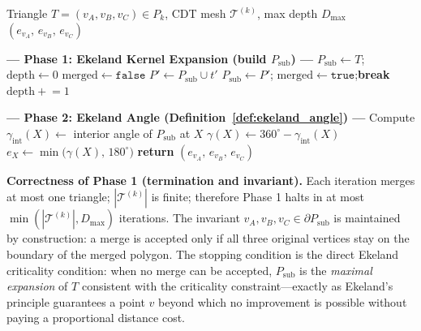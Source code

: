 \documentclass[10pt]{article}
\theoremstyle{plain}
\theoremstyle{definition}
\begin{document}
\begin{algorithm}[htbp]
\caption{Axis-Parallel Reflection Ekeland Angle at triangle vertices}
\label{alg:mfca}
\begin{algorithmic}[1]
\Require Triangle $T=(v_A,v_B,v_C) \in P_k$, CDT mesh $\mathcal{T}^{(k)}$,
         max depth $D_{\max}$
\Ensure $(e_{v_A},\,e_{v_B},\,e_{v_C})$

\smallskip
\State \textbf{--- Phase 1: Ekeland Kernel Expansion (build $P_{\mathrm{sub}}$) ---}
\State $P_{\mathrm{sub}} \leftarrow T$;\quad $\mathrm{depth} \leftarrow 0$
\Repeat
  \State $\mathrm{merged} \leftarrow \mathtt{false}$
    \State $P' \leftarrow P_{\mathrm{sub}} \cup t'$ \quad{}
      \State $P_{\mathrm{sub}} \leftarrow P'$;\quad
             $\mathrm{merged} \leftarrow \mathtt{true}$;\quad \textbf{break}
    \EndIf
  \EndFor
  \State $\mathrm{depth} \mathrel{+}= 1$

\smallskip
\State \textbf{--- Phase 2: Ekeland Angle (Definition~\ref{def:ekeland_angle}) ---}
  \State Compute $\gamma_{\mathrm{int}}(X) \leftarrow$ interior angle of $P_{\mathrm{sub}}$ at $X$
  \State $\gamma(X) \leftarrow 360^\circ - \gamma_{\mathrm{int}}(X)$
  \State $e_X \leftarrow \min\bigl(\gamma(X),\,180^\circ\bigr)$
\EndFor
\State \textbf{return} $(e_{v_A},\,e_{v_B},\,e_{v_C})$
\end{algorithmic}
\end{algorithm}

\noindent\textbf{Correctness of Phase 1 (termination and invariant).}
Each iteration merges at most one triangle; $|\mathcal{T}^{(k)}|$ is finite;
therefore Phase 1 halts in at most $\min(|\mathcal{T}^{(k)}|, D_{\max})$
iterations.
The invariant $v_A,v_B,v_C \in \partial P_{\mathrm{sub}}$ is maintained
by construction: a merge is accepted only if all three original vertices
stay on the boundary of the merged polygon.
The stopping condition is the direct Ekeland criticality condition: when
no merge can be accepted, $P_{\mathrm{sub}}$ is the \emph{maximal expansion}
of $T$ consistent with the criticality constraint---exactly as Ekeland's
principle guarantees a point $v$ beyond which no improvement is possible
without paying a proportional distance cost.
\end{document}

